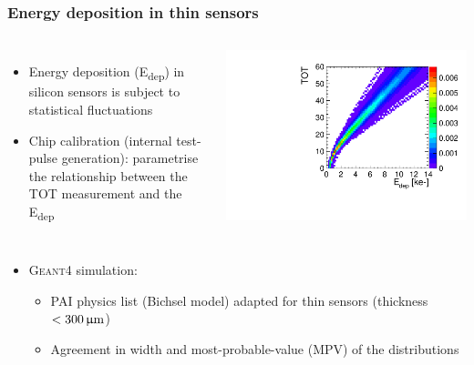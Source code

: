 \begin{frame}
  \frametitle{Energy deposition in thin sensors}

  \begin{columns}
    \begin{itemize}
    \item Energy deposition (E\textsubscript{dep}) in silicon sensors is
      subject to statistical fluctuations
    \item Chip calibration (internal test-pulse generation): parametrise
      the relationship between the TOT measurement and the E\textsubscript{dep}
    \end{itemize}

    \centering
    \includegraphics[width=\textwidth]{../figures/Calibration/TOTcalibration_W0005_E02_thresh1160.pdf}
  \end{columns}

  \begin{itemize}
  \item \textsc{Geant4} simulation:
    \begin{itemize} 
    \item PAI physics list (Bichsel model) adapted for thin
      sensors (thickness$<300\,\upmu\mathrm{m}$)
    \item Agreement in width and most-probable-value (MPV) of the distributions 
    \end{itemize}
  \end{itemize}


\end{frame}
